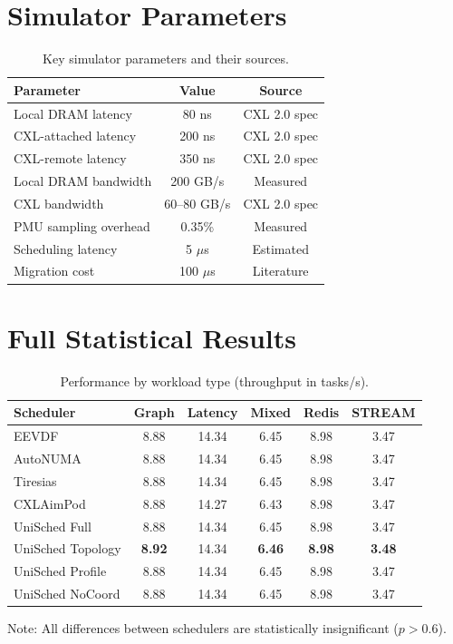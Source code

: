 \documentclass[11pt]{article}
\begin{document}
\section{Simulator Parameters}

\begin{table}[h]
\caption{Key simulator parameters and their sources.}
\label{tab:params}
\centering
\small
\begin{tabular}{lcc}
\toprule
Parameter & Value & Source \\
\midrule
Local DRAM latency & 80 ns & CXL 2.0 spec \\
CXL-attached latency & 200 ns & CXL 2.0 spec \\
CXL-remote latency & 350 ns & CXL 2.0 spec \\
Local DRAM bandwidth & 200 GB/s & Measured \\
CXL bandwidth & 60--80 GB/s & CXL 2.0 spec \\
PMU sampling overhead & 0.35\% & Measured \\
Scheduling latency & 5 $\mu$s & Estimated \\
Migration cost & 100 $\mu$s & Literature \\
\bottomrule
\end{tabular}
\end{table}

\section{Full Statistical Results}

\begin{table}[h]
\caption{Performance by workload type (throughput in tasks/s).}
\label{tab:by_workload}
\centering
\small
\begin{tabular}{lccccc}
\toprule
Scheduler & Graph & Latency & Mixed & Redis & STREAM \\
\midrule
EEVDF & 8.88 & 14.34 & 6.45 & 8.98 & 3.47 \\
AutoNUMA & 8.88 & 14.34 & 6.45 & 8.98 & 3.47 \\
Tiresias & 8.88 & 14.34 & 6.45 & 8.98 & 3.47 \\
CXLAimPod & 8.88 & 14.27 & 6.43 & 8.98 & 3.47 \\
UniSched Full & 8.88 & 14.34 & 6.45 & 8.98 & 3.47 \\
UniSched Topology & \textbf{8.92} & 14.34 & \textbf{6.46} & \textbf{8.98} & \textbf{3.48} \\
UniSched Profile & 8.88 & 14.34 & 6.45 & 8.98 & 3.47 \\
UniSched NoCoord & 8.88 & 14.34 & 6.45 & 8.98 & 3.47 \\
\bottomrule
\end{tabular}
\end{table}

Note: All differences between schedulers are statistically insignificant ($p > 0.6$).
\end{document}
